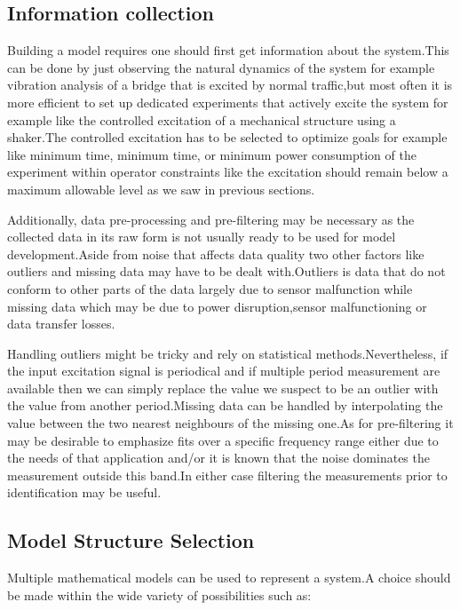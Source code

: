 \documentclass[a4paper,12pt]{report}
\numberwithin{equation}{section}
\begin{document}
\subsection{Information collection}
Building a model requires one should first get information about the system.This can be done by just observing the natural dynamics of the system for example vibration analysis of a bridge that is excited by normal traffic,but most often it is more efficient to set up dedicated experiments that actively excite the system for example like the controlled excitation of a mechanical structure using a shaker.The controlled excitation has to be selected to optimize  goals  for example like minimum time, minimum time, or minimum power consumption of the experiment within operator constraints like the excitation should remain below a maximum allowable level as we saw in previous sections.

Additionally, data pre-processing and pre-filtering  may be necessary as the collected data in its raw form is not usually ready to be used for model development.Aside from noise that affects data quality two other factors like outliers and missing data may have to be dealt with.Outliers is data that do not conform to other parts of the data largely due to sensor malfunction while  missing data which may be due to power disruption,sensor malfunctioning or data transfer losses. 

Handling outliers might be tricky and rely on statistical methods.Nevertheless, if the input excitation signal is periodical and if multiple period measurement are available then we can simply replace the value we suspect to be an outlier with the value from another period.Missing data can be handled by interpolating the value between the two nearest neighbours of the missing one.As for pre-filtering it may be desirable to emphasize fits over a specific frequency range either due to the needs of that application and/or it is known that the noise dominates the measurement outside this band.In either case  filtering the measurements prior to identification may be useful.

\subsection{Model Structure Selection}
Multiple mathematical models can be used to represent a system.A choice should be made within the wide variety of possibilities such as:
\end{document}
